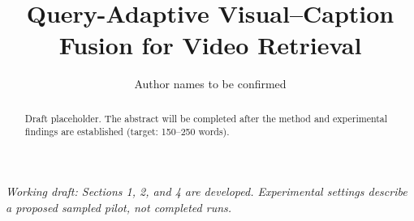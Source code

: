 \documentclass[runningheads]{llncs}
\title{Query-Adaptive Visual--Caption Fusion for Video Retrieval}
\author{Author names to be confirmed}
\institute{Affiliation to be confirmed}
\begin{document}
\maketitle
\begin{abstract}
Draft placeholder. The abstract will be completed after the method and experimental findings are established (target: 150--250 words).
\end{abstract}
\noindent\textit{Working draft: Sections 1, 2, and 4 are developed. Experimental settings describe a proposed sampled pilot, not completed runs.}










\end{document}
